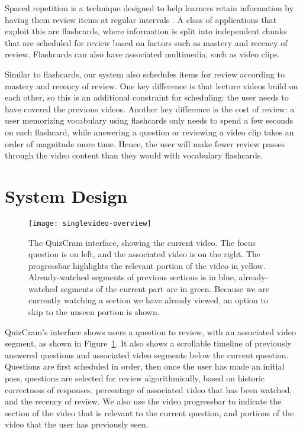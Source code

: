 \documentclass{chi-ext}
\begin{document}
Spaced repetition is a technique designed to help learners retain information by having them review  items at regular intervals \cite{karpicke2011spaced}. A class of applications that exploit this are flashcards, where information is split into independent chunks that are scheduled for review based on factors such as mastery and recency of review. Flashcards can also have associated multimedia, such as video clips.

Similar to flashcards, our system also schedules items for review according to mastery and recency of review. One key difference is that lecture videos build on each other, so this is an additional constraint for scheduling: the user needs to have covered the previous videos. Another key difference is the cost of review: a user memorizing vocabulary using flashcards only needs to spend a few seconds on each flashcard, while answering a question or reviewing a video clip takes an order of magnitude more time. Hence, the user will make fewer review passes through the video content than they would with vocabulary flashcards.
\section{System Design}
\begin{figure}
\centering
\texttt{[image: singlevideo-overview]}
\caption{The QuizCram interface, showing the current video. The focus question is on left, and the associated video is on the right. The progressbar highlights the relevant portion of the video in yellow. Already-watched segments of previous sections is in blue, already-watched segments of the current part are in green. Because we are currently watching a section we have already viewed, an option to skip to the unseen portion is shown.}
\label{fig:figure1}
\end{figure}

QuizCram's interface shows users a question to review, with an associated video segment, as shown in Figure~\ref{fig:figure1}. It also shows a scrollable timeline of previously answered questions and associated video segments below the current question. Questions are first scheduled in order, then once the user has made an initial pass, questions are selected for review algorithmically, based on historic correctness of responses, percentage of associated video that has been watched, and the recency of review. We also use the video progressbar to indicate the section of the video that is relevant to the current question, and portions of the video that the user has previously seen.
\end{document}
